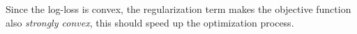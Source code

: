 \begin{rmk}
Since the log-loss is convex, the regularization term makes the objective function also \emph{strongly convex}, this should speed up the optimization process.
\end{rmk}




